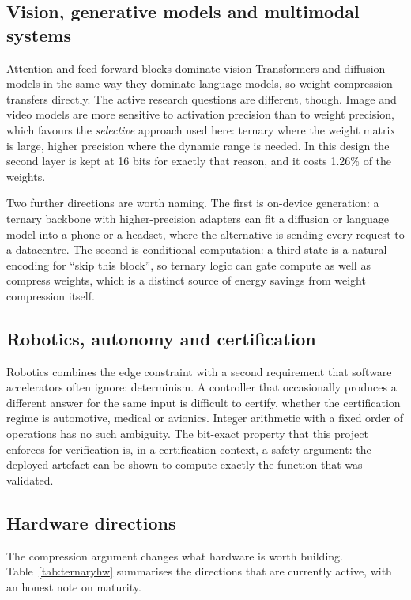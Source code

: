 \documentclass[11pt,a4paper]{article}
\begin{document}
\subsection{Vision, generative models and multimodal systems}

Attention and feed-forward blocks dominate vision Transformers and diffusion
models in the same way they dominate language models, so weight compression
transfers directly. The active research questions are different, though. Image
and video models are more sensitive to activation precision than to weight
precision, which favours the \emph{selective} approach used here: ternary where
the weight matrix is large, higher precision where the dynamic range is needed.
In this design the second layer is kept at 16 bits for exactly that reason, and
it costs 1.26\% of the weights.

Two further directions are worth naming. The first is on-device generation:
a ternary backbone with higher-precision adapters can fit a diffusion or
language model into a phone or a headset, where the alternative is sending every
request to a datacentre. The second is conditional computation: a third state
is a natural encoding for ``skip this block'', so ternary logic can gate compute
as well as compress weights, which is a distinct source of energy savings from
weight compression itself.

\subsection{Robotics, autonomy and certification}

Robotics combines the edge constraint with a second requirement that software
accelerators often ignore: determinism. A controller that occasionally produces
a different answer for the same input is difficult to certify, whether the
certification regime is automotive, medical or avionics. Integer arithmetic with
a fixed order of operations has no such ambiguity. The bit-exact property that
this project enforces for verification is, in a certification context, a safety
argument: the deployed artefact can be shown to compute exactly the function
that was validated.

\subsection{Hardware directions}

The compression argument changes what hardware is worth building. Table~\ref{tab:ternaryhw}
summarises the directions that are currently active, with an honest note on
maturity.
\end{document}
